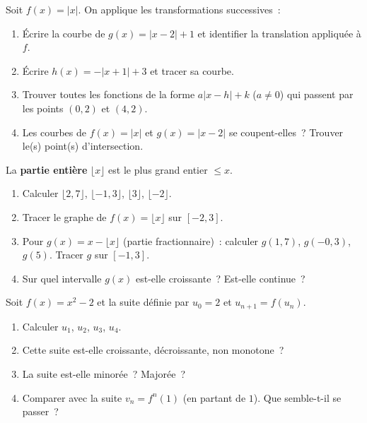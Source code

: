 \begin{challenge}
Soit $f(x)=|x|$. On applique les transformations successives~:
\begin{enumerate}
  \item \'Ecrire la courbe de $g(x)=|x-2|+1$ et identifier
        la translation appliqu\'ee \`a $f$.
  \item \'Ecrire $h(x)=-|x+1|+3$ et tracer sa courbe.
  \item Trouver toutes les fonctions de la forme $a|x-h|+k$
        ($a\ne0$) qui passent par les points $(0,2)$ et $(4,2)$.
  \item Les courbes de $f(x)=|x|$ et $g(x)=|x-2|$ se coupent-elles~?
        Trouver le(s) point(s) d'intersection.
\end{enumerate}
\end{challenge}

\begin{challenge}
La \textbf{partie enti\`ere} $\lfloor x\rfloor$ est le plus grand entier $\leq x$.
\begin{enumerate}
  \item Calculer $\lfloor 2{,}7\rfloor$, $\lfloor -1{,}3\rfloor$,
        $\lfloor 3\rfloor$, $\lfloor -2\rfloor$.
  \item Tracer le graphe de $f(x)=\lfloor x\rfloor$ sur $[-2,3]$.
  \item Pour $g(x)=x-\lfloor x\rfloor$ (partie fractionnaire)~:
        calculer $g(1{,}7)$, $g(-0{,}3)$, $g(5)$.
        Tracer $g$ sur $[-1,3]$.
  \item Sur quel intervalle $g(x)$ est-elle croissante~?
        Est-elle continue~?
\end{enumerate}
\end{challenge}

\begin{challenge}
Soit $f(x)=x^2-2$ et la suite d\'efinie par $u_0=2$ et $u_{n+1}=f(u_n)$.
\begin{enumerate}
  \item Calculer $u_1$, $u_2$, $u_3$, $u_4$.
  \item Cette suite est-elle croissante, d\'ecroissante, non monotone~?
  \item La suite est-elle minor\'ee~? Major\'ee~?
  \item Comparer avec la suite $v_n=f^n(1)$ (en partant de $1$).
        Que semble-t-il se passer~?
\end{enumerate}
\end{challenge}

